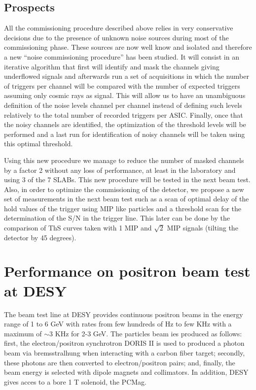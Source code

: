 \documentclass[a4paper,11pt]{article}
\begin{document}
\subsection{Prospects}
\label{sec:comm_prospects}

All the commissioning procedure described above relies in very conservative decisions
due to the presence of unknown noise sources during most of the commissioning phase. These sources are
now well know and isolated and therefore a new ``noise commissioning procedure'' has been studied.
It will consist in an iterative algorithm that first
will identify and mask the channels giving underflowed signals and afterwards run a set of acquisitions
in which the number of triggers per channel will be compared with the number of expected triggers
assuming only cosmic rays as signal. This will allow us to have an
unambiguous definition of the noise levels channel per channel instead of 
defining such levels relatively to the total number
of recorded triggers per ASIC. Finally, once that the noisy channels
are identified, the optimization of the threshold levels
will be performed and a last run for identification of noisy channels will be taken using this optimal
threshold.

Using this new procedure we manage to reduce the number of masked channels by a factor 2 without any loss of performance,
at least in the laboratory and using 3 of the 7 SLABs. This new procedure will be tested in the next beam test.
Also, in order to
optimize the commissioning of the detector,
we propose a new set of measurements in the next beam test such as
a scan of optimal delay of the hold values of the trigger using MIP like particles
and a threshold scan for the determination of the S/N in the trigger line. This later
can be done by the comparison of ThS curves taken with 1 MIP and $\sqrt{2}$ MIP signals (tilting the detector by 45 degrees).


\section{Performance on positron beam test at DESY}
\label{sec:beamtest}


The beam test line at DESY provides continuous positron beams in the energy range of 1 to 6 GeV with
rates from few hundreds of Hz to few KHz with a maximum of $\sim 3$ KHz for 2-3 GeV. 
The particles beam ies produced as follows: first, the electron/positron synchrotron DORIS II 
is used to produced a photon beam via bremsstralhung when interacting with a carbon fiber target;
secondly, these photons are then converted to electron/positron pairs; 
and, finally, the beam energy is selected with dipole magnets and collimators. 
In addition, DESY gives acces to a bore 1 T solenoid, the PCMag.
\end{document}

